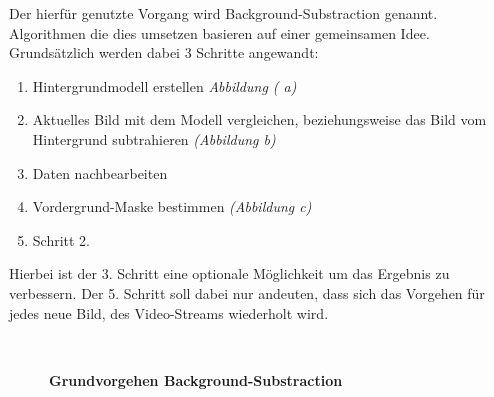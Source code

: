 Der hierfür genutzte Vorgang wird Background-Substraction genannt. Algorithmen die dies umsetzen basieren auf einer gemeinsamen Idee. Grundsätzlich werden dabei 3 Schritte angewandt:
\begin{enumerate}
\item Hintergrundmodell erstellen \textit{Abbildung ( a)}
\item Aktuelles Bild mit dem Modell vergleichen, beziehungsweise das Bild vom Hintergrund subtrahieren \textit{(Abbildung  b)}
\item Daten nachbearbeiten
\item Vordergrund-Maske bestimmen \textit{(Abbildung  c)}
\item Schritt 2.
\end{enumerate}
Hierbei ist der 3. Schritt eine optionale Möglichkeit um das Ergebnis zu verbessern. 
Der 5. Schritt soll dabei nur andeuten, dass sich das Vorgehen für jedes neue Bild, des Video-Streams wiederholt wird.
\begin{figure}[ht]
\qquad
{}\\
\begin{center}
\par\end{center}
\caption{\textbf{Grundvorgehen Background-Substraction}}
\label{Fig:background}
\end{figure}

